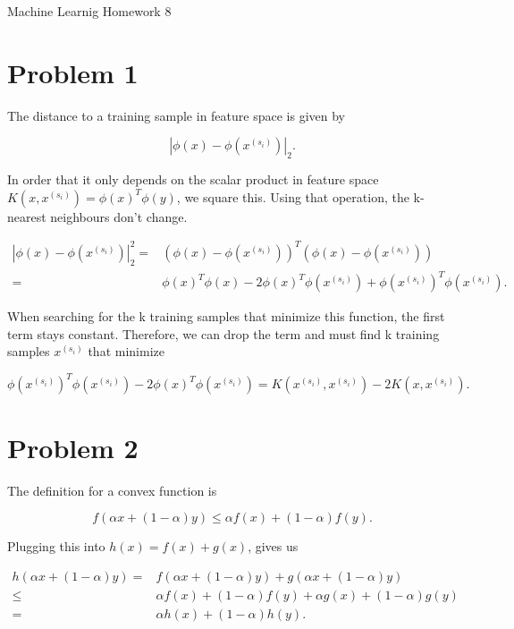 \documentclass[12pt]{article}
\begin{document}
\begin{center}
{\Large Machine Learnig Homework 8} \\[.3in]
\end{center}
\vspace*{.5in}


\section*{Problem 1}

The distance to a training sample in feature space is given by

\begin{equation}
|\phi(x) - \phi(x^{(s_i)})|_2.
\label{eq:}
\end{equation}

In order that it only depends on the scalar product in feature space $K(x, x^{(s_i)}) = \phi(x)^T\phi(y)$, we square this. Using that operation, the k-nearest neighbours don't change.


\begin{align}
|\phi(x) - \phi(x^{(s_i)})|_2^2 =& (\phi(x) - \phi(x^{(s_i)}))^T(\phi(x) - \phi(x^{(s_i)})) \\
=& \phi(x)^T\phi(x) -2\phi(x)^T\phi(x^{(s_i)}) + \phi(x^{(s_i)})^T\phi(x^{(s_i)}).
\label{eq:}
\end{align}


When searching for the k training samples that minimize this function, the first term stays constant. Therefore, we can drop the term and must find k training samples $x^{(s_i)}$ that minimize 

\begin{equation}
 \phi(x^{(s_i)})^T\phi(x^{(s_i)})-2\phi(x)^T\phi(x^{(s_i)}) = K(x^{(s_i)}, x^{(s_i)}) - 2K(x, x^{(s_i)}).
\end{equation}

\section*{Problem 2}

The definition for a convex function is 

\begin{equation}
f(\alpha x + (1-\alpha)y) \leq \alpha f(x) +(1-\alpha)f(y).
\end{equation}

Plugging this into $h(x) = f(x)+g(x)$, gives us

\begin{align}
h(\alpha x + (1-\alpha)y) =& f(\alpha x + (1-\alpha)y) + g(\alpha x + (1-\alpha)y)\\
\leq& \alpha f(x) +(1-\alpha)f(y) +\alpha g(x) +(1-\alpha)g(y)\\
=& \alpha h(x) +(1-\alpha)h(y).
\end{align}
\end{document}
